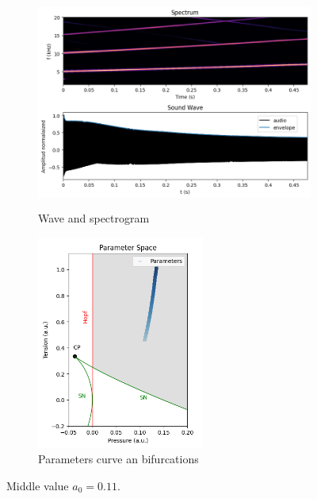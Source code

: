 \begin{figure}[H]
     \centering
     \begin{subfigure}[b]{0.48\textwidth}
         \centering
         \includegraphics[width=\textwidth, height=7cm]{Images/a011_wave.png}
         \caption{Wave and spectrogram}
         \label{fig:a011}
     \end{subfigure}
     \hfill
     \begin{subfigure}[b]{0.48\textwidth}
         \centering
         \includegraphics[width=\textwidth, height=7cm]{Images/a011_param.png}
         \caption{Parameters curve an bifurcations}
         \label{fig:a011}
     \end{subfigure}
     \hfill
        \caption{Middle value $a_0=0.11$.}
        \label{fig:a011}
\end{figure}

